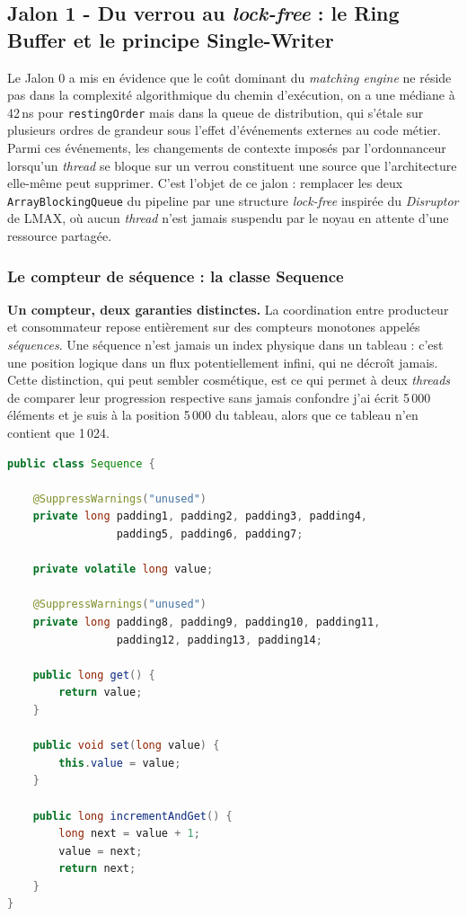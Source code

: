 \subsection{Jalon 1 - Du verrou au \textit{lock-free} : le Ring Buffer et le principe Single-Writer}

Le Jalon 0 a mis en évidence que le coût dominant du \textit{matching engine} ne réside pas dans la complexité algorithmique du chemin d'exécution, on a une médiane à 42\,ns pour \texttt{restingOrder} mais dans la queue de distribution, qui s'étale sur plusieurs ordres de grandeur sous l'effet d'événements externes au code métier. Parmi ces événements, les changements de contexte imposés par l'ordonnanceur lorsqu'un \textit{thread} se bloque sur un verrou constituent une source que l'architecture elle-même peut supprimer. C'est l'objet de ce jalon : remplacer les deux \texttt{ArrayBlockingQueue} du pipeline par une structure \textit{lock-free} inspirée du \textit{Disruptor} de LMAX, où aucun \textit{thread} n'est jamais suspendu par le noyau en attente d'une ressource partagée.

\subsubsection{Le compteur de séquence : la classe Sequence}

\textbf{Un compteur, deux garanties distinctes.} La coordination entre producteur et consommateur repose entièrement sur des compteurs monotones appelés \textit{séquences}. Une séquence n'est jamais un index physique dans un tableau : c'est une position logique dans un flux potentiellement infini, qui ne décroît jamais. Cette distinction, qui peut sembler cosmétique, est ce qui permet à deux \textit{threads} de comparer leur progression respective sans jamais confondre j'ai écrit 5\,000 éléments et je suis à la position 5\,000 du tableau, alors que ce tableau n'en contient que 1\,024.

\begin{lstlisting}[language=Java, caption={Compteur de séquence Single-Writer}]
public class Sequence {

    @SuppressWarnings("unused")
    private long padding1, padding2, padding3, padding4,
                 padding5, padding6, padding7;

    private volatile long value;

    @SuppressWarnings("unused")
    private long padding8, padding9, padding10, padding11,
                 padding12, padding13, padding14;

    public long get() {
        return value;
    }

    public void set(long value) {
        this.value = value;
    }

    public long incrementAndGet() {
        long next = value + 1;
        value = next;
        return next;
    }
}
\end{lstlisting}

